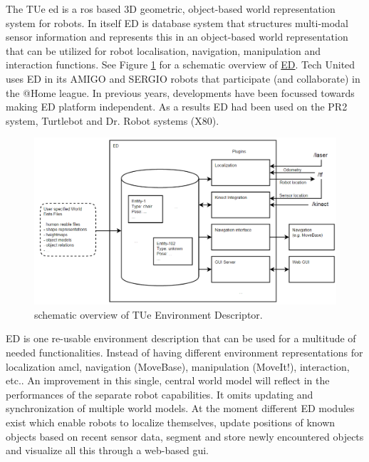 The TUe \acrfull{ed} is a \acrfull{ros} based 3D geometric, object-based world representation system for robots. In itself ED is database system that structures multi-modal sensor information and represents this in an object-based world representation that can be utilized for robot localisation, navigation, manipulation and interaction functions. See Figure \ref{fig:ed} for a schematic overview of \href{https://github.com/tue-robotics/ed}{ED}. %
Tech United uses ED in its AMIGO and SERGIO robots that participate (and collaborate) in the @Home league. In previous years, developments have been focussed towards making ED platform independent. As a results ED had been used on the PR2 system, Turtlebot and Dr. Robot systems (X80).
\begin{figure}[h]
	\includegraphics[width = \linewidth]{Figures/ed_overview}
	\caption{schematic overview of TUe Environment Descriptor.}
	\label{fig:ed}
\end{figure}
ED is one re-usable environment description that can be used for a multitude of needed functionalities. Instead of having different environment representations for localization \acrfull{amcl}, navigation (MoveBase), manipulation (MoveIt!), interaction, etc.. An improvement in this single, central world model will reflect in the performances of the separate robot capabilities. It omits updating and synchronization of multiple world models. At the moment different ED modules exist which enable robots to localize themselves, update positions of known objects based on recent sensor data, segment and store newly encountered objects and visualize all this through a web-based \acrshort{gui}.
